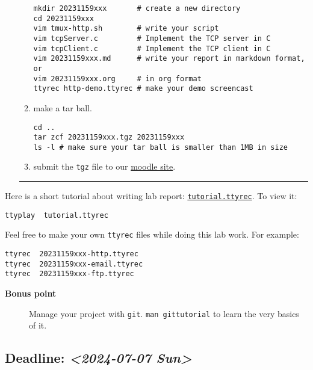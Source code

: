 \documentclass{article}
\begin{document}
\begin{itemize}
\begin{enumerate}
\begin{verbatim}
mkdir 20231159xxx       # create a new directory
cd 20231159xxx
vim tmux-http.sh        # write your script
vim tcpServer.c         # Implement the TCP server in C
vim tcpClient.c         # Implement the TCP client in C
vim 20231159xxx.md      # write your report in markdown format, or
vim 20231159xxx.org     # in org format
ttyrec http-demo.ttyrec # make your demo screencast
\end{verbatim}

\item make a tar ball.
\begin{verbatim}
cd ..                                                      
tar zcf 20231159xxx.tgz 20231159xxx                        
ls -l # make sure your tar ball is smaller than 1MB in size
\end{verbatim}

\item submit the \texttt{tgz} file to our \href{https://cs6.swfu.edu.cn/moodle/mod/assign/view.php?id=760}{moodle site}.
\end{enumerate}

\noindent\rule{\textwidth}{0.5pt}
\end{itemize}

Here is a short tutorial about writing lab report: \href{tutorial.ttyrec}{\texttt{tutorial.ttyrec}}. To view it:

\begin{verbatim}
ttyplay  tutorial.ttyrec
\end{verbatim}

Feel free to make your own \texttt{ttyrec} files while doing this lab work. For example:

\begin{verbatim}
ttyrec  20231159xxx-http.ttyrec
ttyrec  20231159xxx-email.ttyrec
ttyrec  20231159xxx-ftp.ttyrec
\end{verbatim}

\begin{description}
\item[{\textbf{Bonus point}}] Manage your project with \texttt{git}. \texttt{man gittutorial} to
learn the very basics of it.
\end{description}

\subsection{Deadline: \textit{<2024-07-07 Sun>}}
\label{sec:org4f38793}
\end{document}
